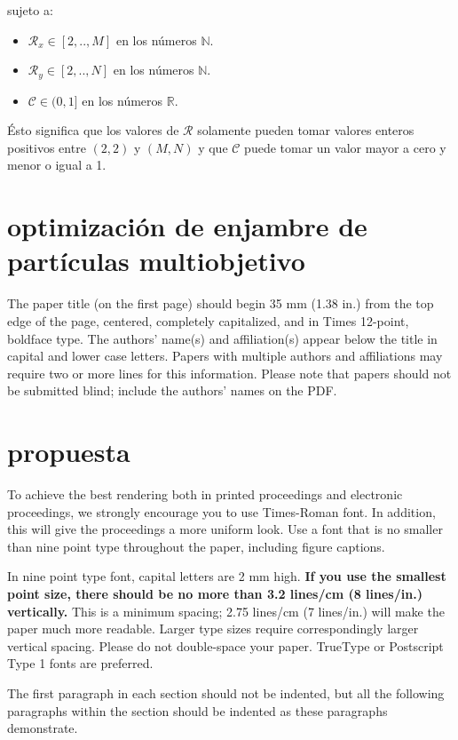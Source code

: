 \documentclass[spanish]{article}
\begin{document}
sujeto a:

\begin{itemize}
\item $\mathcal{R}_x \in [2,..,M]$ en los números $\mathbb{N}$.
\item $\mathcal{R}_y \in [2,..,N]$ en los números $\mathbb{N}$.
\item $\mathscr{C} \in (0,1]$ en los números $\mathbb{R}$.
\end{itemize}

Ésto significa que los valores de $\mathcal{R}$ solamente pueden tomar valores enteros positivos entre $(2,2)$ y $(M,N)$ y que $\mathscr{C}$ puede tomar un valor mayor a cero y menor o igual a 1.

\section{optimización de enjambre de partículas multiobjetivo}
\label{sec:pagestyle}

The paper title (on the first page) should begin 35 mm (1.38 in.) from the
top edge of the page, centered, completely capitalized, and in Times 12-point,
boldface type. The authors' name(s) and affiliation(s) appear below the title
in capital and lower case letters. Papers with multiple authors and
affiliations may require two or more lines for this information. Please note
that papers should not be submitted blind; include the authors' names on the
PDF.

\section{propuesta}
\label{sec:typestyle}

To achieve the best rendering both in printed proceedings and electronic proceedings, we
strongly encourage you to use Times-Roman font. In addition, this will give
the proceedings a more uniform look. Use a font that is no smaller than nine
point type throughout the paper, including figure captions.

In nine point type font, capital letters are 2 mm high. {\bf If you use the
smallest point size, there should be no more than 3.2 lines/cm (8 lines/in.)
vertically.} This is a minimum spacing; 2.75 lines/cm (7 lines/in.) will make
the paper much more readable. Larger type sizes require correspondingly larger
vertical spacing. Please do not double-space your paper. TrueType or
Postscript Type 1 fonts are preferred.

The first paragraph in each section should not be indented, but all the
following paragraphs within the section should be indented as these paragraphs
demonstrate.
\end{document}
